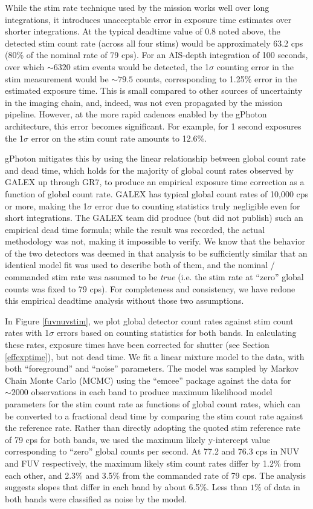 \documentclass[preprint]{aastex}
\begin{document}
While the stim rate technique used by the mission works well over long integrations, it introduces unacceptable error in exposure time estimates over shorter integrations. At the typical deadtime value of 0.8 noted above, the detected stim count rate (across all four stims) would be approximately 63.2 cps (80\% of the nominal rate of 79 cps). For an AIS-depth integration of 100 seconds, over which $\sim 6320$ stim events would be detected, the 1$\sigma$ counting error in the stim measurement would be $\sim 79.5$ counts, corresponding to 1.25\% error in the estimated exposure time. This is small compared to other sources of uncertainty in the imaging chain, and, indeed, was not even propagated by the mission pipeline. However, at the more rapid cadences enabled by the gPhoton architecture, this error becomes significant. For example, for 1 second exposures the 1$\sigma$ error on the stim count rate amounts to 12.6\%.

gPhoton mitigates this by using the linear relationship between global count rate and dead time, which holds for the majority of global count rates observed by GALEX up through GR7, to produce an empirical exposure time correction as a function of global count rate. GALEX has typical global count rates of 10,000 cps or more, making the 1$\sigma$ error due to counting statistics truly negligible even for short integrations. The GALEX team did produce (but did not publish) such an empirical dead time formula; while the result was recorded, the actual methodology was not, making it impossible to verify. We know that the behavior of the two detectors was deemed in that analysis to be sufficiently similar that an identical model fit was used to describe both of them, and the nominal / commanded stim rate was assumed to be \emph{true} (i.e. the stim rate at ``zero'' global counts was fixed to 79 cps). For completeness and consistency, we have redone this empirical deadtime analysis without those two assumptions.

In Figure \ref{fuvnuvstim}, we plot global detector count rates against stim count rates with 1$\sigma$ errors based on counting statistics for both bands. In calculating these rates, exposure times have been corrected for shutter (see Section \ref{effexptime}), but not dead time. We fit a linear mixture model to the data, with both ``foreground'' and ``noise'' parameters. The model was sampled by Markov Chain Monte Carlo (MCMC) using the ``emcee'' package \citep{for2013} against the data for $\sim 2000$ observations in each band to produce maximum likelihood model parameters for the stim count rate as functions of global count rates, which can be converted to a fractional dead time by comparing the stim count rate against the reference rate. Rather than directly adopting the quoted stim reference rate of 79 cps for both bands, we used the maximum likely y-intercept value corresponding to ``zero'' global counts per second. At 77.2 and 76.3 cps in NUV and FUV respectively, the maximum likely stim count rates differ by 1.2\% from each other, and 2.3\% and 3.5\% from the commanded rate of 79 cps. The analysis suggests slopes that differ in each band by about 6.5\%. Less than $1\%$ of data in both bands were classified as noise by the model.
\end{document}

